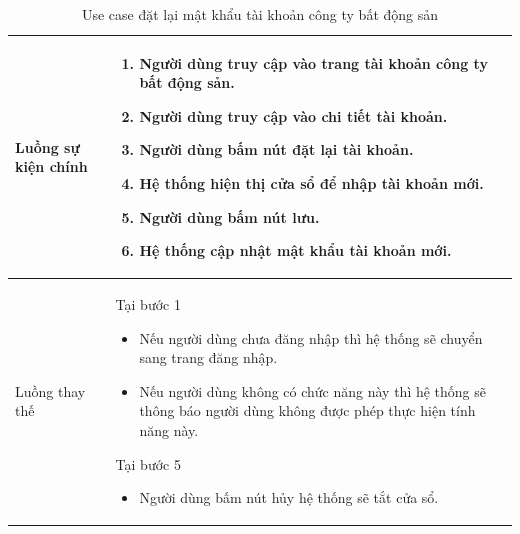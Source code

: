 \documentclass[12pt,a4paper]{article}
\begin{document}
\begin{table}[H]
\begin{tabular}{|p{3.5cm}|p{11.5cm}|c|}
            Luồng sự kiện chính & \vspace{-.8cm}\begin{enumerate}
                                                    \item Người dùng truy cập vào trang tài khoản công ty bất động sản.
                                                    \item Người dùng truy cập vào chi tiết tài khoản.
                                                    \item  Người dùng bấm nút đặt lại tài khoản.
                                                    \item  Hệ thống hiện thị cửa sổ để nhập tài khoản mới.
                                                    \item  Người dùng bấm nút lưu.
                                                    \item Hệ thống cập nhật mật khẩu tài khoản mới.
            \end{enumerate}
            \\
            \hline
            Luồng thay thế & Tại bước 1\newline
            \vspace{-.8cm}\begin{itemize}
                              \item Nếu người dùng chưa đăng nhập thì hệ thống sẽ chuyển sang trang đăng nhập.
                              \item Nếu người dùng không có chức năng này thì hệ thống sẽ thông báo người dùng không được phép thực hiện tính năng này.
            \end{itemize}

            Tại bước 5\newline
            \vspace{-.8cm}\begin{itemize}
                              \item Người dùng bấm nút hủy hệ thống sẽ tắt cửa sổ.
            \end{itemize} \\
            \hline
        \end{tabular}
        \caption{Use case đặt lại mật khẩu tài khoản công ty bất động sản}

    \end{table}


\end{document}

